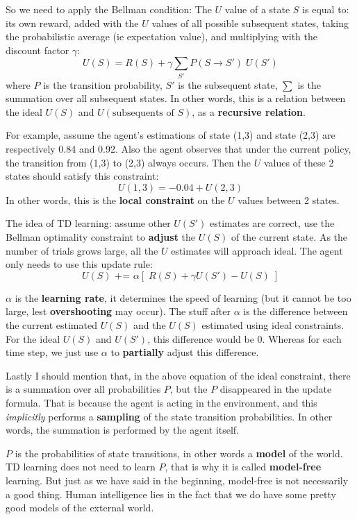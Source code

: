 \documentclass[orivec]{llncs}
\begin{document}
So we need to apply the Bellman condition:  The $U$ value of a state $S$ is equal to:  its own reward, added with the $U$ values of all possible subsequent states, taking the probabilistic average (ie expectation value), and multiplying with the discount factor $\gamma$:
$$ U(S) = R(S) + \gamma \sum_{S'} P(S \rightarrow S') \; U(S') $$
where $P$ is the transition probability, $S'$ is the subsequent state, $\sum$ is the summation over all subsequent states.  In other words, this is a relation between the ideal $U(S)$ and $U(\mbox{subsequents of }S)$, as a \textbf{recursive relation}.

For example, assume the agent's estimations of state (1,3) and state (2,3) are respectively 0.84 and 0.92.  Also the agent observes that under the current policy, the transition from (1,3) to (2,3) always occurs.  Then the $U$ values of these 2 states should satisfy this constraint:
$$ U(1,3) = -0.04 + U(2,3) $$
In other words, this is the \textbf{local constraint} on the $U$ values between 2 states.

The idea of TD learning:  assume other $U(S')$ estimates are correct, use the Bellman optimality constraint to \textbf{adjust} the $U(S)$ of the current state.  As the number of trials grows large, all the $U$ estimates will approach ideal.  The agent only needs to use this update rule:
$$ U(S) \mbox{  +=  } \alpha [ \; R(S) + \gamma U(S') - U(S) \; ] $$

$\alpha$ is the \textbf{learning rate}, it determines the speed of learning (but it cannot be too large, lest \textbf{overshooting} may occur).  The stuff after $\alpha$ is the difference between the current estimated $U(S)$ and the $U(S)$ estimated using ideal constraints.  For the ideal $U(S)$ and $U(S')$, this difference would be 0.  Whereas for each time step, we just use $\alpha$ to \textbf{partially} adjust this difference.

Lastly I should mention that, in the above equation of the ideal constraint, there is a summation over all probabilities $P$, but the $P$ disappeared in the update formula.  That is because the agent is acting in the environment, and this \textit{implicitly} performs a \textbf{sampling} of the state transition probabilities.  In other words, the summation is performed by the agent itself.

$P$ is the probabilities of state transitions, in other words a \textbf{model} of the world.  TD learning does not need to learn $P$, that is why it is called \textbf{model-free} learning.  But just as we have said in the beginning, model-free is not necessarily a good thing.  Human intelligence lies in the fact that we do have some pretty good models of the external world.
\end{document}
